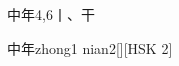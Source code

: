 \begin{entry}{中年}{4,6}{⼁、⼲}
  \begin{phonetics}{中年}{zhong1 nian2}[][HSK 2]
  \end{phonetics}
\end{entry}

